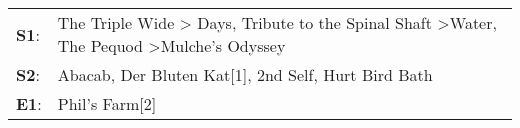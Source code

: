\begin{supertabular}{p{0.03\textwidth}p{0.92\textwidth}}
 \textbf{S1}:  &  The Triple Wide\textsuperscript{} \textgreater {} Days\textsuperscript{}, \enspace Tribute to the Spinal Shaft\textsuperscript{} \textgreater \enspace Water\textsuperscript{}, \enspace The Pequod\textsuperscript{} \textgreater \enspace Mulche's Odyssey\textsuperscript{}  \enspace  \\
 \textbf{S2}:  &                                                                                                                                   Abacab\textsuperscript{}, \enspace Der Bluten Kat[1]\textsuperscript{}, \enspace 2nd Self\textsuperscript{}, \enspace Hurt Bird Bath\textsuperscript{}  \enspace  \\
 \textbf{E1}:  &                                                                                                                                                                                                                                                         Phil's Farm[2]\textsuperscript{}  \enspace  \\
\end{supertabular}
